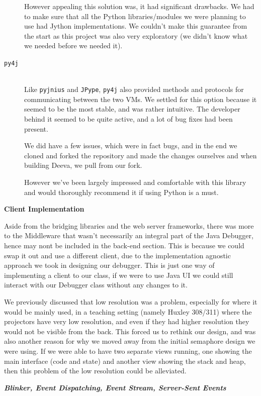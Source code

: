 \documentclass[11pt, a4paper]{article}
\begin{document}
\begin{description}
    However appealing this solution was, it had significant drawbacks. We had to
    make sure that all the Python libraries/modules we were planning to use had
    Jython implementations. We couldn't make this guarantee from the start as
    this project was also very exploratory (we didn't know what we needed before
    we needed it).
  \item[\texttt{py4j}]\hfill\\
    Like \texttt{pyjnius} and \texttt{JPype}, \texttt{py4j} also provided
    methods and protocols for communicating between the two VMs. We settled for
    this option because it seemed to be the most stable, and was rather
    intuitive. The developer behind it seemed to be quite active, and a lot of
    bug fixes had been present.

    We did have a few issues, which were in fact bugs, and in the end we cloned
    and forked the repository and made the changes ourselves and when building
    Deeva, we pull from our fork.

    However we've been largely impressed and comfortable with this library and
    would thoroughly recommend it if using Python is a must.
\end{description}

\textbf{Client Implementation}

Aside from the bridging libraries and the web server frameworks, there was more
to the Middleware that wasn't necessarily an integral part of the Java Debugger,
hence may nont be included in the back-end section. This is because we could
swap it out and use a different client, due to the implementation agnostic
approach we took in designing our debugger. This is just one way of implementing
a client to our class, if we were to use Java UI we could still interact with
our Debugger class without any changes to it.

We previously discussed that low resolution was a problem, especially for where
it would be mainly used, in a teaching setting (namely Huxley 308/311) where the
projectors have very low resolution, and even if they had higher resolution they
would not be visible from the back. This forced us to rethink our design, and
was also another reason for why we moved away from the initial semaphore design
we were using. If we were able to have two separate views running, one showing
the main interface (code and state) and another view showing the stack and heap,
then this problem of the low resolution could be alleviated.

\textbf{\emph{Blinker, Event Dispatching, Event Stream, Server-Sent Events}}
\end{document}
